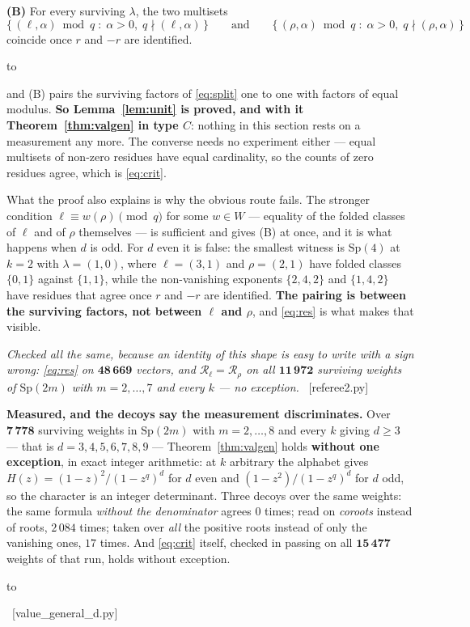 \documentclass[11pt,a4paper]{article}
\theoremstyle{definition}
\newcommand{\Sp}{\mathrm{Sp}}
\newcommand{\ver}[1]{\unskip\penalty0\ \textcolor{azul}{\small\textsf{[#1]}}}
\newenvironment{keybox}
  {\par\vspace{9pt}\begin{lrbox}{\fichabox}%
   \begin{minipage}{0.90\textwidth}\vspace{7pt}\setlength{\parskip}{3pt}}
  {\vspace{7pt}\end{minipage}\end{lrbox}%
   \par\noindent\hbox to \textwidth{\hfill
   \textcolor{azul}{\rule[-\dp\fichabox]{3.2pt}{\dimexpr\ht\fichabox+\dp\fichabox\relax}}%
   \colorbox{fondoficha}{\usebox{\fichabox}}\hfill}%
   \par\vspace{9pt}}
\begin{document}
\begin{keybox}
\textbf{(B)} \quad For every surviving $\lambda$, the two multisets
\[
\bigl\{\,(\ell,\alpha)\bmod q \;:\; \alpha>0,\; q\nmid(\ell,\alpha)\,\bigr\}
\qquad\text{and}\qquad
\bigl\{\,(\rho,\alpha)\bmod q \;:\; \alpha>0,\; q\nmid(\rho,\alpha)\,\bigr\}
\]
coincide once $r$ and $-r$ are identified.
\end{keybox}

\noindent and (B) pairs the surviving factors of \eqref{eq:split} one to one with factors of equal
modulus. \textbf{So Lemma~\ref{lem:unit} is proved, and with it Theorem~\ref{thm:valgen} in type
$C$}: nothing in this section rests on a measurement any more. The converse needs no experiment
either --- equal multisets of non-zero residues have equal cardinality, so the counts of zero
residues agree, which is \eqref{eq:crit}.

\smallskip
\noindent What the proof also explains is why the obvious route fails. The stronger condition
$\ell\equiv w(\rho)\pmod q$ for some $w\in W$ --- equality of the folded classes of $\ell$ and of
$\rho$ themselves --- is sufficient and gives (B) at once, and it is what happens when $d$ is odd.
For $d$ even it is false: the smallest witness is $\Sp(4)$ at $k=2$ with $\lambda=(1,0)$, where
$\ell=(3,1)$ and $\rho=(2,1)$ have folded classes $\{0,1\}$ against $\{1,1\}$, while the
non-vanishing exponents $\{2,4,2\}$ and $\{1,4,2\}$ have residues that agree once $r$ and $-r$ are
identified. \textbf{The pairing is between the surviving factors, not between $\ell$ and $\rho$},
and \eqref{eq:res} is what makes that visible.

\emph{Checked all the same, because an identity of this shape is easy to write with a sign wrong:
\eqref{eq:res} on $\mathbf{48\,669}$ vectors, and $\mathscr{R}_\ell=\mathscr{R}_\rho$ on all
$\mathbf{11\,972}$ surviving weights of $\Sp(2m)$ with $m=2,\dots,7$ and every $k$ --- no exception.}
\ver{referee2.py}

\begin{keybox}
\textbf{Measured, and the decoys say the measurement discriminates.} Over $\mathbf{7\,778}$
surviving weights in $\Sp(2m)$ with $m=2,\dots,8$ and every $k$ giving $d\ge3$ --- that is
$d=3,4,5,6,7,8,9$ --- Theorem~\ref{thm:valgen} holds \textbf{without one exception}, in exact integer
arithmetic: at $k$ arbitrary the alphabet gives $H(z)=(1-z)^2/(1-z^q)^d$ for $d$ even and
$(1-z^2)/(1-z^q)^d$ for $d$ odd, so the character is an integer determinant. Three decoys over the
same weights: the same formula \emph{without the denominator} agrees $0$ times; read on
\emph{coroots} instead of roots, $2\,084$ times; taken over \emph{all} the positive roots instead of
only the vanishing ones, $17$ times. And \eqref{eq:crit} itself, checked in passing on all
$\mathbf{15\,477}$ weights of that run, holds without exception.
\end{keybox}
\ver{value\_general\_d.py}
\end{document}
